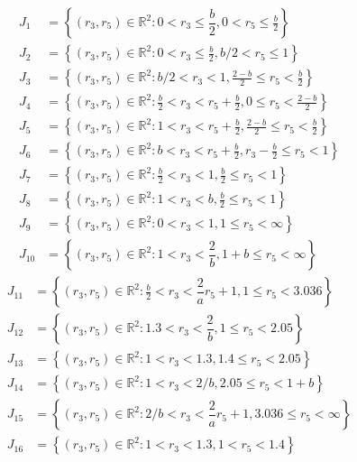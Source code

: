 \documentclass[final,11pt]{article}
\numberwithin{equation}{section}
\theoremstyle{definition}
\begin{document}
\begin{equation*}
\begin{split}
J_1&=\left\{(r_3,r_5)\in \mathbb{R}^2 \colon 0<r_3\leq \dfrac{b}{2}, 0<r_5\leq \frac{b}{2} \right\}\\
J_2&=\left\{(r_3,r_5)\in \mathbb{R}^2 \colon 0<r_3\leq \frac{b}{2}, b/2<r_5\leq 1 \right\}\\
J_3&=\left\{(r_3,r_5)\in \mathbb{R}^2 \colon b/2<r_3<1, \frac{2-b}{2}\leq r_5< \frac{b}{2} \right\} \\
J_4&=\left\{(r_3,r_5)\in \mathbb{R}^2 \colon \frac{b}{2}<r_3<r_5+\frac{b}{2}, 0\leq r_5< \frac{2-b}{2} \right\}\\
J_5&=\left\{(r_3,r_5)\in \mathbb{R}^2 \colon 1<r_3<r_5+\frac{b}{2}, \frac{2-b}{2}\leq r_5< \frac{b}{2} \right\}\\
J_6&=\left\{(r_3,r_5)\in \mathbb{R}^2 \colon b<r_3<r_5+\frac{b}{2}, r_3-\frac{b}{2}\leq r_5< 1 \right\} \\
J_7&=\left\{(r_3,r_5)\in \mathbb{R}^2 \colon \frac{b}{2}<r_3<1, \frac{b}{2}\leq r_5<1 \right\}\\
J_8&=\left\{(r_3,r_5)\in \mathbb{R}^2 \colon 1<r_3<b, \frac{b}{2}\leq r_5<1 \right\}\\
J_9&=\left\{(r_3,r_5)\in \mathbb{R}^2 \colon 0<r_3<1, 1\leq r_5<\infty \right\}\\
J_{10}&=\left\{(r_3,r_5)\in \mathbb{R}^2 \colon 1<r_3<\dfrac{2}{b}, 1+b\leq r_5<\infty \right\}
\end{split}
\end{equation*}
\begin{equation*}
\begin{split}
J_{11}&=\left\{(r_3,r_5)\in \mathbb{R}^2 \colon \frac{b}{2}<r_3<\dfrac{2}{a}r_{5}+1, 1\leq r_5<3.036	 \right\}
\\
J_{12}&=\left\{(r_3,r_5)\in \mathbb{R}^2 \colon 1.3<r_3<\dfrac{2}{b}, 1\leq r_5<2.05	 \right\}\\
J_{13}&=\left\{(r_3,r_5)\in \mathbb{R}^2 \colon 1<r_3<1.3, 1.4\leq r_5<2.05	 \right\}\\
J_{14}&=\left\{(r_3,r_5)\in \mathbb{R}^2 \colon 1<r_3<2/b, 2.05\leq r_5<1+b	 \right\}\\
J_{15}&=\left\{(r_3,r_5)\in \mathbb{R}^2 \colon 2/b<r_3<\dfrac{2}{a}r_{5}+1, 3.036\leq r_5<\infty	 \right\}\\
J_{16}&=\left\{(r_3,r_5)\in \mathbb{R}^2 \colon 1<r_3<1.3, 1<r_5<1.4 	 \right\}
\end{split}
\end{equation*}
\end{document}
